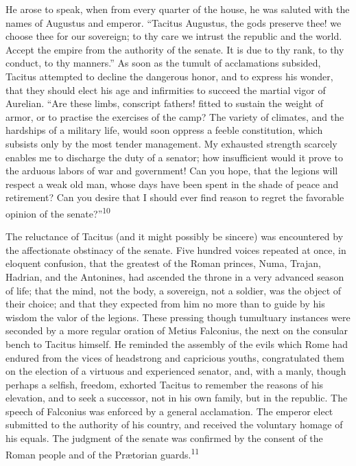 
He arose to speak, when from every quarter of the house, he was
saluted with the names of Augustus and emperor. “Tacitus
Augustus, the gods preserve thee! we choose thee for our
sovereign; to thy care we intrust the republic and the world.
Accept the empire from the authority of the senate. It is due to
thy rank, to thy conduct, to thy manners.” As soon as the tumult
of acclamations subsided, Tacitus attempted to decline the
dangerous honor, and to express his wonder, that they should
elect his age and infirmities to succeed the martial vigor of
Aurelian. “Are these limbs, conscript fathers! fitted to sustain
the weight of armor, or to practise the exercises of the camp?
The variety of climates, and the hardships of a military life,
would soon oppress a feeble constitution, which subsists only by
the most tender management. My exhausted strength scarcely
enables me to discharge the duty of a senator; how insufficient
would it prove to the arduous labors of war and government! Can
you hope, that the legions will respect a weak old man, whose
days have been spent in the shade of peace and retirement? Can
you desire that I should ever find reason to regret the favorable
opinion of the senate?”\textsuperscript{10}


The reluctance of Tacitus (and it might possibly be sincere) was
encountered by the affectionate obstinacy of the senate. Five
hundred voices repeated at once, in eloquent confusion, that the
greatest of the Roman princes, Numa, Trajan, Hadrian, and the
Antonines, had ascended the throne in a very advanced season of
life; that the mind, not the body, a sovereign, not a soldier,
was the object of their choice; and that they expected from him
no more than to guide by his wisdom the valor of the legions.
These pressing though tumultuary instances were seconded by a
more regular oration of Metius Falconius, the next on the
consular bench to Tacitus himself. He reminded the assembly of
the evils which Rome had endured from the vices of headstrong and
capricious youths, congratulated them on the election of a
virtuous and experienced senator, and, with a manly, though
perhaps a selfish, freedom, exhorted Tacitus to remember the
reasons of his elevation, and to seek a successor, not in his own
family, but in the republic. The speech of Falconius was enforced
by a general acclamation. The emperor elect submitted to the
authority of his country, and received the voluntary homage of
his equals. The judgment of the senate was confirmed by the
consent of the Roman people and of the Prætorian guards.\textsuperscript{11}

